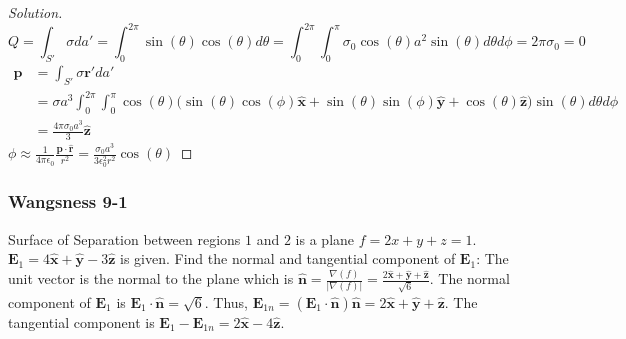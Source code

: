 \documentclass[crop=false,class=article,oneside]{standalone}
\begin{document}
        \begin{proof}[Solution]
        \begin{equation*}
            Q = \int_{S'} \sigma da'= \int_{0}^{2\pi} \sin(\theta)\cos(\theta)d\theta = \int_{0}^{2\pi} \int_{0}^{\pi} \sigma_{0} \cos(\theta) a^2 \sin(\theta) d\theta d\phi = 2\pi \sigma_{0} = 0
        \end{equation*}
        \begin{align*}
            \mathbf{p} &= \int_{S'}\sigma \mathbf{r}' da'\\
            &= \sigma a^{3}\int_{0}^{2\pi} \int_{0}^{\pi} \cos(\theta) \big(\sin(\theta) \cos(\phi) \hat{\mathbf{x}} + \sin(\theta)\sin(\phi) \hat{\mathbf{y}} + \cos(\theta) \hat{\mathbf{z}}\big)\sin(\theta)d\theta d\phi\\
            &= \frac{4\pi \sigma_0 a^3}{3} \hat{\mathbf{z}}
        \end{align*}
        $\phi \approx \frac{1}{4\pi \epsilon_0} \frac{\mathbf{p}\cdot \hat{\mathbf{r}}}{r^2} = \frac{\sigma_0 a^3}{3\epsilon_0^2 r^2}\cos(\theta)$
        \end{proof}
        \subsubsection{Wangsness 9-1}
        Surface of Separation between regions $1$ and $2$ is a plane $f=2x+y+z=1$. $\mathbf{E}_1 = 4\hat{\mathbf{x}}+\hat{\mathbf{y}}-3\hat{\mathbf{z}}$ is given. Find the normal and tangential component of $\mathbf{E}_1$: The unit vector is the normal to the plane which is $\hat{\mathbf{n}}=\frac{\nabla(f)}{|\nabla(f)|} = \frac{2\hat{\mathbf{x}}+\hat{\mathbf{y}}+\hat{\mathbf{z}}}{\sqrt{6}}$. The normal component of $\mathbf{E}_1$ is $\mathbf{E}_1 \cdot \hat{\mathbf{n}} = \sqrt{6}$. Thus, $\mathbf{E}_{1n} = (\mathbf{E}_1 \cdot \hat{\mathbf{n}})\hat{\mathbf{n}} = 2\hat{\mathbf{x}}+\hat{\mathbf{y}}+\hat{\mathbf{z}}$. The tangential component is $\mathbf{E}_1 - \mathbf{E}_{1n} = 2\hat{\mathbf{x}}-4\hat{\mathbf{z}}$.
\end{document}
